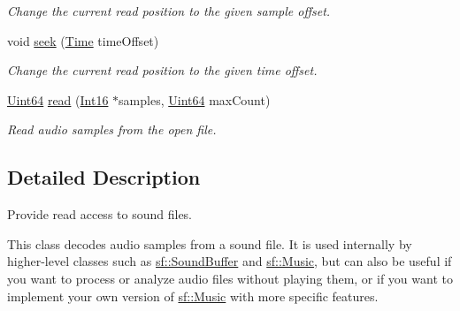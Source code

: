 \begin{DoxyCompactItemize}
\begin{DoxyCompactList}\small\item\em Change the current read position to the given sample offset. \end{DoxyCompactList}\item 
void \hyperlink{classsf_1_1_input_sound_file_a8eee7af58ad75ddc61f93ad72e2d66c1}{seek} (\hyperlink{classsf_1_1_time}{Time} time\-Offset)
\begin{DoxyCompactList}\small\item\em Change the current read position to the given time offset. \end{DoxyCompactList}\item 
\hyperlink{namespacesf_add9ac83466d96b9f50a009b9f4064266}{Uint64} \hyperlink{classsf_1_1_input_sound_file_a83d6f64617456601edeb0daf9d14a17f}{read} (\hyperlink{namespacesf_a3c8e10435e2a310a7741755e66b5c94e}{Int16} $\ast$samples, \hyperlink{namespacesf_add9ac83466d96b9f50a009b9f4064266}{Uint64} max\-Count)
\begin{DoxyCompactList}\small\item\em Read audio samples from the open file. \end{DoxyCompactList}\end{DoxyCompactItemize}


\subsection{Detailed Description}
Provide read access to sound files. 

This class decodes audio samples from a sound file. It is used internally by higher-\/level classes such as \hyperlink{classsf_1_1_sound_buffer}{sf\-::\-Sound\-Buffer} and \hyperlink{classsf_1_1_music}{sf\-::\-Music}, but can also be useful if you want to process or analyze audio files without playing them, or if you want to implement your own version of \hyperlink{classsf_1_1_music}{sf\-::\-Music} with more specific features.

